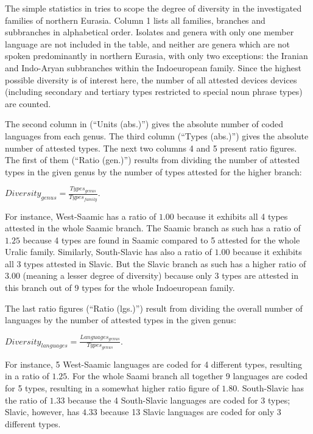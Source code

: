 The simple statistics in  tries to scope the degree of diversity in the investigated families of northern Eurasia. Column 1 lists all families, branches and subbranches in alphabetical order. Isolates and genera with only one member language are not included in the table, and neither are genera which are not spoken predominantly in northern Eurasia, with only two exceptions: the Iranian and Indo-Aryan subbranches within the Indoeuropean family. Since the highest possible diversity is of interest here, the number of all attested devices devices (including secondary and tertiary types restricted to special noun phrase types) are counted. 

The second column in  (“Units (abs.)”) gives the absolute number of coded languages from each genus. The third column (“Types (abs.)”) gives the absolute number of attested types. The next two columns 4 and 5 present ratio figures. The first of them  (“Ratio (gen.)”) results from dividing the number of attested types in the given genus by the number of types attested for the higher branch:\medskip

$Diversity_{genus} = \frac{Types_{genus}}{Types_{family}}$.\medskip

\noindent For instance, West-Saamic has a ratio of $1.00$ because it exhibits all 4 types attested in the whole Saamic branch. The Saamic branch as such has a ratio of $1.25$ because 4 types are found in Saamic compared to 5 attested for the whole Uralic family. Similarly, South-Slavic has also a ratio of $1.00$ because it exhibits all 3 types attested in Slavic. But the Slavic branch as such has a higher ratio of $3.00$ (meaning a lesser degree of diversity) because only 3 types are attested in this branch out of 9 types for the whole Indoeuropean family. 

The last ratio figures (“Ratio (lgs.)”) result from dividing the overall number of languages by the number of attested types in the given genus:\medskip

$Diversity_{languages} = \frac{Languages_{genus}}{Types_{genus}}$.\medskip

\noindent For instance, 5 West-Saamic languages are coded for 4 different types, resulting in a ratio of $1.25$. For the whole Saami branch all together 9 languages are coded for 5 types, resulting in a somewhat higher ratio figure of $1.80$. South-Slavic has the ratio of $1.33$ because the 4 South-Slavic languages are coded for 3 types; Slavic, however, has $4.33$ because 13 Slavic languages are coded for only 3 different types.

